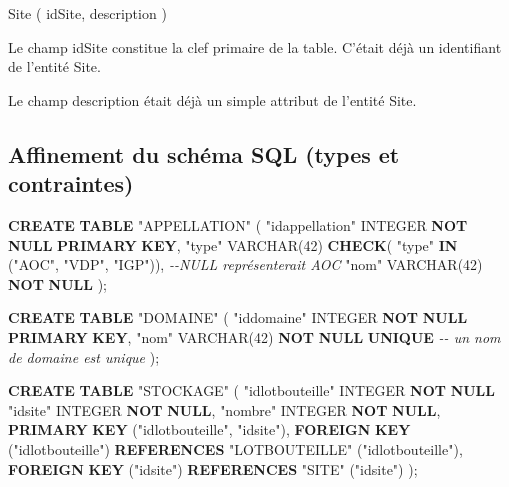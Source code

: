 \documentclass[11pt]{article}
\newenvironment{Shaded}{}{}
\newcommand{\KeywordTok}[1]{\textcolor[rgb]{0.00,0.44,0.13}{\textbf{{#1}}}}
\newcommand{\DataTypeTok}[1]{\textcolor[rgb]{0.56,0.13,0.00}{{#1}}}
\newcommand{\DecValTok}[1]{\textcolor[rgb]{0.25,0.63,0.44}{{#1}}}
\newcommand{\CommentTok}[1]{\textcolor[rgb]{0.38,0.63,0.69}{\textit{{#1}}}}
\newcommand{\OtherTok}[1]{\textcolor[rgb]{0.00,0.44,0.13}{{#1}}}
\newcommand{\NormalTok}[1]{{#1}}
\begin{document}
{Site} ( {idSite}, {description} )

Le champ idSite constitue la clef primaire de la table. C'était déjà un
identifiant de l'entité Site.

Le champ description était déjà un simple attribut de l'entité Site.

    \hypertarget{affinement-du-schuxe9ma-sql-types-et-contraintes}{%
\subsection{Affinement du schéma SQL (types et
contraintes)}\label{affinement-du-schuxe9ma-sql-types-et-contraintes}}

\begin{Shaded}
\begin{Highlighting}[]
\KeywordTok{CREATE} \KeywordTok{TABLE} \OtherTok{"APPELLATION"}\NormalTok{ (}
  \OtherTok{"idappellation"} \DataTypeTok{INTEGER} \KeywordTok{NOT} \KeywordTok{NULL} \KeywordTok{PRIMARY} \KeywordTok{KEY}\NormalTok{,}
  \OtherTok{"type"} \DataTypeTok{VARCHAR}\NormalTok{(}\DecValTok{42}\NormalTok{) }\KeywordTok{CHECK}\NormalTok{( }\OtherTok{"type"} \KeywordTok{IN}\NormalTok{ (}\OtherTok{"AOC"}\NormalTok{, }\OtherTok{"VDP"}\NormalTok{, }\OtherTok{"IGP"}\NormalTok{)), }\CommentTok{{-}{-}NULL représenterait AOC}
  \OtherTok{"nom"} \DataTypeTok{VARCHAR}\NormalTok{(}\DecValTok{42}\NormalTok{) }\KeywordTok{NOT} \KeywordTok{NULL}
\NormalTok{);}

\KeywordTok{CREATE} \KeywordTok{TABLE} \OtherTok{"DOMAINE"}\NormalTok{ (}
  \OtherTok{"iddomaine"} \DataTypeTok{INTEGER} \KeywordTok{NOT} \KeywordTok{NULL} \KeywordTok{PRIMARY} \KeywordTok{KEY}\NormalTok{,}
  \OtherTok{"nom"} \DataTypeTok{VARCHAR}\NormalTok{(}\DecValTok{42}\NormalTok{)  }\KeywordTok{NOT} \KeywordTok{NULL} \KeywordTok{UNIQUE}         \CommentTok{{-}{-} un nom de domaine est unique                        }
\NormalTok{);}

\KeywordTok{CREATE} \KeywordTok{TABLE} \OtherTok{"STOCKAGE"}\NormalTok{ (}
  \OtherTok{"idlotbouteille"} \DataTypeTok{INTEGER} \KeywordTok{NOT} \KeywordTok{NULL}
  \OtherTok{"idsite"} \DataTypeTok{INTEGER} \KeywordTok{NOT} \KeywordTok{NULL}\NormalTok{,}
  \OtherTok{"nombre"} \DataTypeTok{INTEGER} \KeywordTok{NOT} \KeywordTok{NULL}\NormalTok{,}
  \KeywordTok{PRIMARY} \KeywordTok{KEY}\NormalTok{ (}\OtherTok{"idlotbouteille"}\NormalTok{, }\OtherTok{"idsite"}\NormalTok{),}
  \KeywordTok{FOREIGN} \KeywordTok{KEY}\NormalTok{ (}\OtherTok{"idlotbouteille"}\NormalTok{) }\KeywordTok{REFERENCES} \OtherTok{"LOTBOUTEILLE"}\NormalTok{ (}\OtherTok{"idlotbouteille"}\NormalTok{),}
  \KeywordTok{FOREIGN} \KeywordTok{KEY}\NormalTok{ (}\OtherTok{"idsite"}\NormalTok{) }\KeywordTok{REFERENCES} \OtherTok{"SITE"}\NormalTok{ (}\OtherTok{"idsite"}\NormalTok{)}
\NormalTok{);}


\end{Highlighting}
\end{Shaded}
\end{document}
